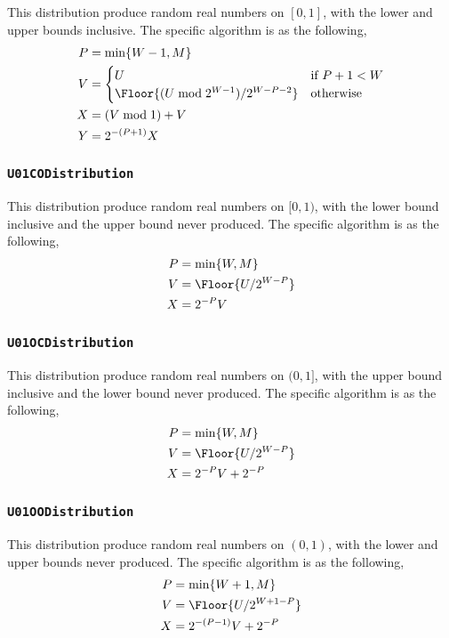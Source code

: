This distribution produce random real numbers on $[0, 1]$, with the lower and
upper bounds inclusive. The specific algorithm is as the following,
\begin{align*}
  P &= \min\{W - 1, M\} \\
  V &= \begin{cases}
    U &\text{if } P + 1 < W \\
    \Floor{(U \bmod 2^{W - 1}) / 2^{W - P -2}} &\text{otherwise}
  \end{cases} \\
  X &= (V \bmod 1) + V \\
  Y &= 2^{-(P + 1)} X
\end{align*}

\subsubsection{\texttt{U01CODistribution}}

This distribution produce random real numbers on $[0, 1)$, with the lower bound
inclusive and the upper bound never produced. The specific algorithm is as the
following,
\begin{align*}
  P &= \min\{W, M\} \\
  V &= \Floor{U / 2^{W - P}} \\
  X &= 2^{-P} V
\end{align*}

\subsubsection{\texttt{U01OCDistribution}}

This distribution produce random real numbers on $(0, 1]$, with the upper bound
inclusive and the lower bound never produced. The specific algorithm is as the
following,
\begin{align*}
  P &= \min\{W, M\} \\
  V &= \Floor{U / 2^{W - P}} \\
  X &= 2^{-P} V + 2^{-P}
\end{align*}

\subsubsection{\texttt{U01OODistribution}}

This distribution produce random real numbers on $(0, 1)$, with the lower and
upper bounds never produced. The specific algorithm is as the following,
\begin{align*}
  P &= \min\{W + 1, M\} \\
  V &= \Floor{U / 2^{W + 1 - P}} \\
  X &= 2^{-(P - 1)} V + 2^{-P}
\end{align*}


